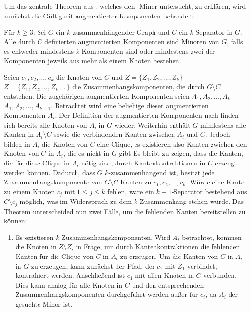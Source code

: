 Um das zentrale Theorem aus \cite{KeM92}, welches den \kdd-Minor untersucht, zu erklären, wird zunächst die Gültigkeit augmentierter Komponenten behandelt:
\begin{theorem}\label{eq:Theorem33}
  Für $k \geq 3$: Sei $G$ ein $k$-zusammenhängender Graph und $C$ ein $k$-Separator in $G$.
  Alle durch $C$ definierten augmentierten Komponenten sind Minoren von $G$, falls es entweder mindestens $k$ Komponenten sind oder mindestens zwei der Komponenten jeweils aus mehr als einem Knoten bestehen.
\end{theorem}
\begin{beweis}
  Seien $c_1, c_2, ..., c_k$ die Knoten von $C$ und $Z = \{Z_1, Z_2, ..., Z_k\}$ \bzw $Z = \{Z_1, Z_2, ..., Z_{k-1}\}$ die Zusammenhangskomponenten, die durch $G \setminus C$ entstehen.
  Die zugehörigen augmentierten Komponenten seien $A_1, A_2, ..., A_k$ \bzw $A_1, A_2, ..., A_{k-1}$.
  Betrachtet wird eine beliebige dieser augmentierten Komponenten $A_i$.
  Der Definition der augmentierten Komponenten nach finden sich bereits alle Knoten von $A_i$ in $G$ wieder. %
  Weiterhin enthält $G$ mindestens alle Kanten in $A_i \setminus C$ sowie die verbindenden Kanten zwischen $A_i$ und $C$.
  Jedoch bilden in $A_i$ die Knoten von $C$ eine Clique, es existieren also \ggf Kanten zwichen den Knoten von $C$ in $A_i$, die es nicht in $G$ gibt
  Es bleibt zu zeigen, dass die Kanten, die für diese Clique in $A_i$ nötig sind, durch Kantenkontraktionen in $G$ erzeugt werden können.
  Dadurch, dass $G$ $k$-zusammenhängend ist, besitzt jede Zusammenhangskomponente von $G \setminus C$ Kanten zu $c_1, c_2, ..., c_k$.
  Würde eine Kante zu einem Knoten $c_j$ mit $1 \leq j \leq k$ fehlen, wäre ein $k-1$-Separator bestehend aus $C \setminus c_j$ möglich, was im Widerspruch zu dem $k$-Zusammenhang stehen würde.
  Das Theorem unterscheided nun zwei Fälle, um die fehlenden Kanten bereitstellen zu können:
  \begin{enumerate}
    \item Es existieren $k$ Zusammenhangskomponenten.
          Wird $A_i$ betrachtet, kommen die Knoten in $Z \setminus Z_i$ in Frage, um durch Kantenkontraktionen die fehlenden Kanten für die Clique von $C$ in $A_i$ zu erzeugen.
          Um die Kanten von $C$ in $A_i$ in $G$ zu erzeugen, kann zunächst der Pfad, der $c_1$ mit $Z_1$ verbindet, kontrahiert werden.
          Anschließend ist $c_1$ mit allen Knoten in $C$ verbunden.
          Dies kann analog für alle Knoten in $C$ und den entsprechenden Zusammenhangskomponenten durchgeführt werden außer für $c_i$, da $A_i$ der gesuchte Minor ist.

\end{enumerate}
\end{beweis}
